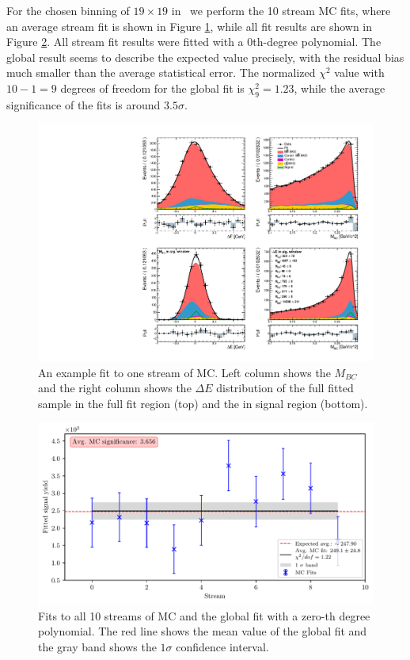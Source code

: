 For the chosen binning of $19 \times 19$ in \vars~we perform the 10 stream MC fits, where an average stream fit is shown in Figure \ref{fig:sig_streamfit}, while all fit results are shown in Figure \ref{fig:sig_global}. All stream fit results were fitted with a 0th-degree polynomial. The global result seems to describe the expected value precisely, with the residual bias much smaller than the average statistical error. The normalized $\chi^2$ value with $10-1=9$ degrees of freedom for the global fit is $\chi^2_9 = 1.23$, while the average significance of the fits is around $3.5 \sigma$.

\begin{figure}[H]
	\centering
	\captionsetup{width=0.8\linewidth}
	\includegraphics[width=\linewidth]{fig/sig_fit_mc}
	\caption{An example fit to one stream of MC. Left column shows the $M_{BC}$ and the right column shows the $\Delta E$ distribution of the full fitted sample in the full fit region (top) and the in signal region (bottom).}
	\label{fig:sig_streamfit}
\end{figure}

\begin{figure}[H]
	\centering
	\captionsetup{width=0.8\linewidth}
	\includegraphics[width=\linewidth]{fig/sig_global_mc}
	\caption{Fits to all 10 streams of MC and the global fit with a zero-th degree polynomial. The red line shows the mean value of the global fit and the gray band shows the $1\sigma$ confidence interval.}
	\label{fig:sig_global}
\end{figure}

